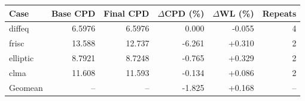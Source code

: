 \begin{tabular}{lrrrrr}
\toprule
Case & Base CPD & Final CPD & $\Delta$CPD (\%) & $\Delta$WL (\%) & Repeats \\
\midrule
diffeq & 6.5976 & 6.5976 & 0.000 & -0.055 & 4 \\
frisc & 13.588 & 12.737 & -6.261 & +0.310 & 2 \\
elliptic & 8.7921 & 8.7248 & -0.765 & +0.329 & 2 \\
clma & 11.608 & 11.593 & -0.134 & +0.086 & 2 \\
\midrule
Geomean & -- & -- & -1.825 & +0.168 & -- \\
\bottomrule
\end{tabular}
